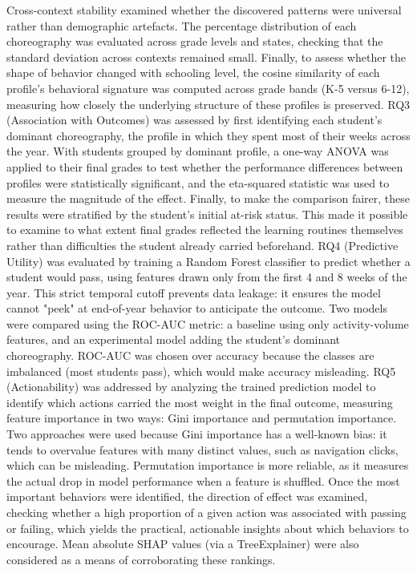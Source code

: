 Cross-context stability examined whether the discovered patterns were universal rather than demographic artefacts. The percentage distribution of each choreography was evaluated across grade levels and states, checking that the standard deviation across contexts remained small. Finally, to assess whether the shape of behavior changed with schooling level, the cosine similarity of each profile's behavioral signature was computed across grade bands (K-5 versus 6-12), measuring how closely the underlying structure of these profiles is preserved.
RQ3 (Association with Outcomes) was assessed by first identifying each student's dominant choreography, the profile in which they spent most of their weeks across the year. With students grouped by dominant profile, a one-way ANOVA was applied to their final grades to test whether the performance differences between profiles were statistically significant, and the eta-squared statistic was used to measure the magnitude of the effect. Finally, to make the comparison fairer, these results were stratified by the student's initial at-risk status. This made it possible to examine to what extent final grades reflected the learning routines themselves rather than difficulties the student already carried beforehand.
RQ4 (Predictive Utility) was evaluated by training a Random Forest classifier to predict whether a student would pass, using features drawn only from the first 4 and 8 weeks of the year. This strict temporal cutoff prevents data leakage: it ensures the model cannot "peek" at end-of-year behavior to anticipate the outcome. Two models were compared using the ROC-AUC metric: a baseline using only activity-volume features, and an experimental model adding the student's dominant choreography. ROC-AUC was chosen over accuracy because the classes are imbalanced (most students pass), which would make accuracy misleading.
RQ5 (Actionability) was addressed by analyzing the trained prediction model to identify which actions carried the most weight in the final outcome, measuring feature importance in two ways: Gini importance and permutation importance. Two approaches were used because Gini importance has a well-known bias: it tends to overvalue features with many distinct values, such as navigation clicks, which can be misleading. Permutation importance is more reliable, as it measures the actual drop in model performance when a feature is shuffled. Once the most important behaviors were identified, the direction of effect was examined, checking whether a high proportion of a given action was associated with passing or failing, which yields the practical, actionable insights about which behaviors to encourage. Mean absolute SHAP values (via a TreeExplainer) were also considered as a means of corroborating these rankings.

